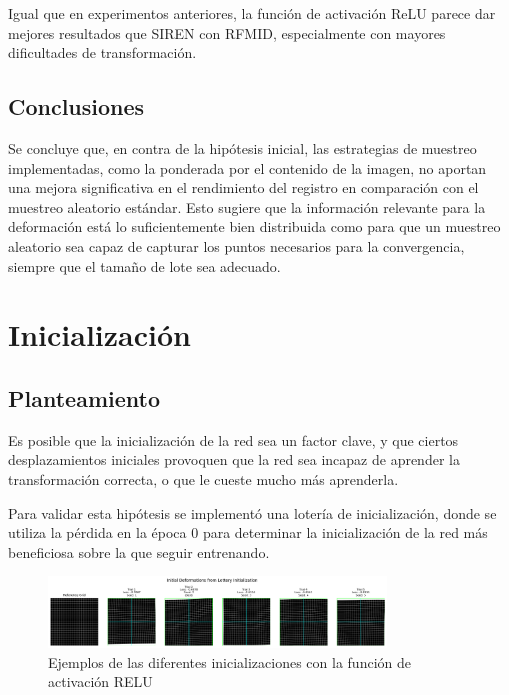 Igual que en experimentos anteriores, la función de activación ReLU parece dar mejores resultados que SIREN con RFMID, especialmente con mayores dificultades de transformación.

\subsection{Conclusiones}
\label{subsec:Conclusions-sampling}
Se concluye que, en contra de la hipótesis inicial, las estrategias de muestreo implementadas, como la ponderada por el contenido de la imagen, no aportan una mejora significativa en el rendimiento del registro en comparación con el muestreo aleatorio estándar. Esto sugiere que la información relevante para la deformación está lo suficientemente bien distribuida como para que un muestreo aleatorio sea capaz de capturar los puntos necesarios para la convergencia, siempre que el tamaño de lote sea adecuado.

\section{Inicialización}
\label{sec:Inicialización}

\subsection{Planteamiento}
\label{subsec:Planteamento-initialization}

Es posible que la inicialización de la red sea un factor clave, y que ciertos desplazamientos iniciales provoquen que la red sea incapaz de aprender la transformación correcta, o que le cueste mucho más aprenderla.

Para validar esta hipótesis se implementó una lotería de inicialización, donde se utiliza la pérdida en la época 0 para determinar la inicialización de la red más beneficiosa sobre la que seguir entrenando.

\begin{figure}[tbp]
    \centering
    \includegraphics[width=0.8\textwidth]{imaxes/lottery/initial_deformations_combinedMLP.png}
    \caption{Ejemplos de las diferentes inicializaciones con la función de activación RELU}
    \label{fig:lottery_initial_deformations_combinedMLP}
\end{figure}

